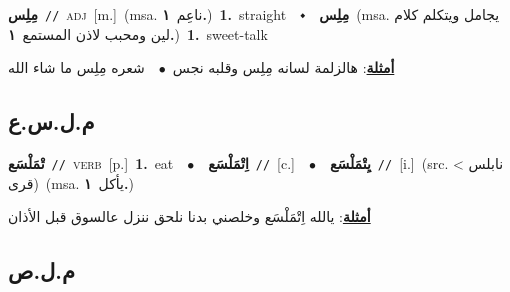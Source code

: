 \documentclass[10pt,a4paper,twoside]{article} %
\begin{document}
\begin{multicols}{2}
{\setlength\topsep{0pt}\textbf{\foreignlanguage{arabic}{مِلِس}}\ {\color{gray}\texttt{//}\color{black}}\ \textsc{adj}\ [m.]\ \color{gray}(msa. \foreignlanguage{arabic}{ناعِم}~\foreignlanguage{arabic}{\textbf{١.}})\color{black}\ \textbf{1.}~straight\ \ $\smblkdiamond$\ \ \setlength\topsep{0pt}\textbf{\foreignlanguage{arabic}{مِلِس}}\ \color{gray}(msa. \foreignlanguage{arabic}{يجامل ويتكلم كلام لين ومحبب لاذن المستمع}~\foreignlanguage{arabic}{\textbf{١.}})\color{black}\ \textbf{1.}~sweet-talk\  \begin{flushright}\color{gray}\foreignlanguage{arabic}{\textbf{\underline{\foreignlanguage{arabic}{أمثلة}}}: هالزلمة لسانه مِلِس وقلبه نجس\ $\bullet$\ \  شعره مِلِس ما شاء الله}\end{flushright}\color{black}} \vspace{2mm}

\vspace{-3mm}
\subsection*{\color{blue}\foreignlanguage{arabic}{م.ل.س.ع}\color{blue}{}} 

{\setlength\topsep{0pt}\textbf{\foreignlanguage{arabic}{تْمَلْسَع}}\ {\color{gray}\texttt{//}\color{black}}\ \textsc{verb}\ [p.]\ \textbf{1.}~eat\ \ $\bullet$\ \ \setlength\topsep{0pt}\textbf{\foreignlanguage{arabic}{اِتْمَلْسَع}}\ {\color{gray}\texttt{//}\color{black}}\ [c.]\ \ $\bullet$\ \ \setlength\topsep{0pt}\textbf{\foreignlanguage{arabic}{يِتْمَلْسَع}}\ {\color{gray}\texttt{//}\color{black}}\ [i.]\ (src. \color{gray}\foreignlanguage{arabic}{نابلس > قرى}\color{black})\ \color{gray}(msa. \foreignlanguage{arabic}{يأكل}~\foreignlanguage{arabic}{\textbf{١.}})\color{black}\  \begin{flushright}\color{gray}\foreignlanguage{arabic}{\textbf{\underline{\foreignlanguage{arabic}{أمثلة}}}: يالله اِتْمَلْسَع وخلصني بدنا نلحق ننزل عالسوق قبل الأذان}\end{flushright}\color{black}} \vspace{2mm}

\vspace{-3mm}
\subsection*{\color{blue}\foreignlanguage{arabic}{م.ل.ص}\color{blue}{}} 


\end{multicols}
\end{document}
